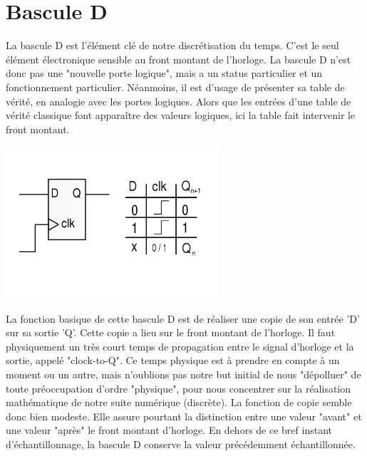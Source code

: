 \section{Bascule D}
La bascule D est l'élément clé de notre discrétisation du temps. C'est le seul élément électronique sensible au front montant de l'horloge. La bascule D n'est donc pas une "nouvelle porte logique",
mais a un status particulier et un fonctionnement particulier. Néanmoins, il est d'usage de présenter sa table de vérité, en analogie avec les portes logiques. Alors que les entrées
d'une table de vérité classique font apparaître des valeurs logiques, ici la table fait intervenir le front montant.\\
\begin{center}
   \begin{minipage}[t]{8cm}
     \vspace{0pt}
     \centering
     \includegraphics[width=8cm]{./figures/d-ff-infos.jpg}
   \end{minipage}
\end{center} %
La fonction basique de cette bascule D est de réaliser une copie de son entrée 'D' sur sa sortie 'Q'. Cette copie a lieu sur le front montant de l'horloge. Il faut physiquement
un très court temps de propagation entre le signal d'horloge et la sortie, appelé "clock-to-Q". Ce temps physique est à prendre en compte à un moment ou un autre,
mais n'oublions pas notre but initial de nous "dépolluer" de toute préoccupation d'ordre "physique", pour nous concentrer sur la réalisation mathématique de notre suite numérique (discrète).
La fonction de copie semble donc bien modeste. Elle assure pourtant la distinction entre une valeur "avant" et une valeur "après" le front montant d'horloge. En dehors
de ce bref instant d'échantillonnage, la bascule D conserve la valeur précédemment échantillonnée.

